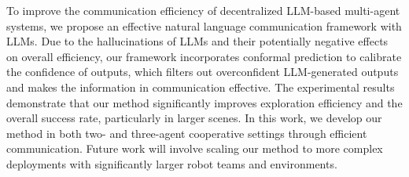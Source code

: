 To improve the communication efficiency of decentralized LLM-based multi-agent systems, we propose an effective natural language communication framework with LLMs. Due to the hallucinations of LLMs and their potentially negative effects on overall efficiency, our framework incorporates conformal prediction to calibrate the confidence of outputs, which filters out overconfident LLM-generated outputs and makes the information in communication effective.
The experimental results demonstrate that our method significantly improves exploration efficiency and the overall success rate, particularly in larger scenes.  In this work, we develop our method in both two- and three-agent cooperative settings through efficient communication. Future work will involve scaling our method to more complex deployments with significantly larger robot teams and environments.
